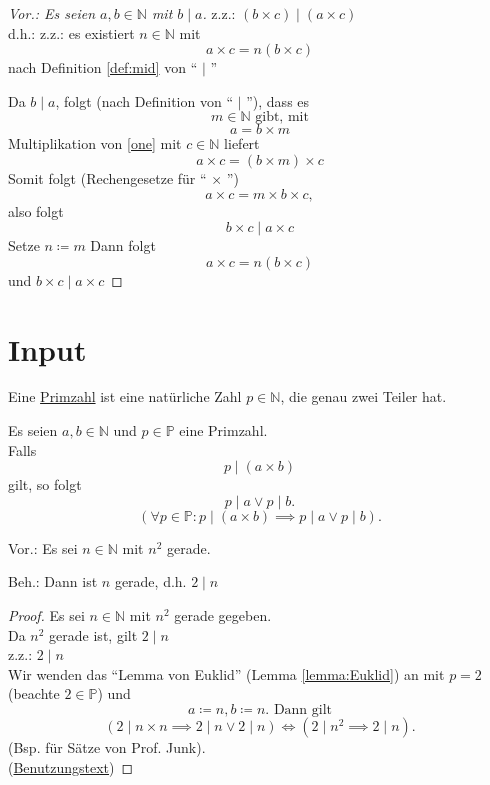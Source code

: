 \documentclass[a4paper, parskip = true, fleqn, headsepline = true]{scrartcl}
\newcommand{\qed}{\tag{$\square$}}
\DeclareRobustCommand{\qed}{%
	\ifmmode \tag*{$\square$}%
	\else \leavevmode\unskip\penalty9999 \hbox{}\nobreak\hfill\quad\hbox{$\square$}%
	\fi%
}
\begin{document}
\begin{task}
	\begin{proof}[Vor.: Es seien $ a, b \in \mathbb{N} $ mit $ b \mid a $]
		z.z.: $ ( b \times c ) \mid ( a \times c ) $\\
		d.h.: z.z.: es existiert $ n \in \mathbb{N} $ mit
		\[ a \times c = n ( b \times c ) \]
		nach Definition \ref{def:mid} von `` $\mid$ ''\par
		Da $ b \mid a $, folgt (nach Definition von `` $\mid$ ''), dass es
		\[ m \in \mathbb{N} \text{ gibt, mit} \]
		\begin{equation}
			\label{one}
			a = b \times m
		\end{equation}
		Multiplikation von \ref{one} mit $ c \in \mathbb{N} $ liefert
		\[ a \times c = ( b \times m ) \times c \]
		Somit folgt (Rechengesetze für `` $\times$ '')
		\[ a \times c = m \times b \times c, \]
		also folgt
		\[ b \times c \mid a \times c\]
		Setze $n \coloneqq m $
		Dann folgt
		\[ a \times c = n ( b \times c ) \]
		und $ b \times c \mid a \times c $
	\end{proof}
\end{task}

\section{Input}

\begin{definition}[Primzahl]
	Eine \underline{Primzahl} ist eine natürliche Zahl $ p \in \mathbb{N} $, die genau zwei Teiler hat.
\end{definition}

\begin{lemma}
	\label{lemma:Euklid}
	Es seien $ a, b \in \mathbb{N} $ und $ p \in \mathbb{P} $ eine Primzahl.\\
	Falls
	\[ p \mid ( a \times b ) \]
	gilt, so folgt
	\[ p \mid a \vee p \mid b. \]
	\[ ( \forall p \in \mathbb{P} : p \mid ( a \times b ) \implies p \mid a \vee p \mid b ). \]
\end{lemma}

\begin{task}
	Vor.: Es sei $ n \in \mathbb{N} $ mit $ n^2 $ gerade.\par
	Beh.: Dann ist $ n $ gerade, d.h. $ 2 \mid n $
	\begin{proof}
		Es sei $ n \in \mathbb{N} $ mit $ n^2 $ gerade gegeben.\\
		Da $ n^2 $ gerade ist, gilt $ 2 \mid n $\\
		z.z.: $ 2 \mid n $\\
		Wir wenden das ``Lemma von Euklid'' (Lemma \ref{lemma:Euklid}) an mit $ p = 2 $ (beachte $ 2 \in \mathbb{P} $) und
		\[ a \coloneqq n, b \coloneqq n. \text{ Dann gilt} \]
		\[ ( 2 \mid n \times n \implies 2 \mid n \vee 2 \mid n ) \iff ( 2 \mid n^2 \implies 2 \mid n ). \qed \]
		(Bsp. für  Sätze von Prof. Junk).\\
		(\underline{Benutzungstext})
	\end{proof}
\end{task}
\end{document}
